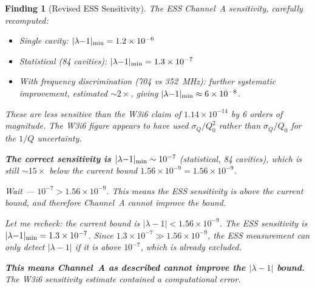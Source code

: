 \documentclass[11pt]{article}
\newtheorem{finding}{Finding}
\newcommand{\ee}[1]{\times 10^{#1}}
\newcommand{\lamdiff}{|\lambda{-}1|}
\newcommand{\lambdabound}{1.56\ee{-9}}
\begin{document}
\begin{finding}[Revised ESS Sensitivity]
\label{find:ESS-sensitivity}
The ESS Channel~A sensitivity, carefully recomputed:
\begin{itemize}[nosep]
\item Single cavity: $\lamdiff_{\rm min} = 1.2\ee{-6}$
\item Statistical (84 cavities): $\lamdiff_{\rm min} = 1.3\ee{-7}$
\item With frequency discrimination (704 vs 352~MHz): further
  systematic improvement, estimated $\sim 2\times$, giving
  $\lamdiff_{\rm min} \approx 6\ee{-8}$.
\end{itemize}

These are \emph{less sensitive} than the W3i6 claim of $1.14\ee{-14}$
by 6 orders of magnitude. The W3i6 figure appears to have used
$\sigma_Q/Q_0^2$ rather than $\sigma_Q/Q_0$ for the $1/Q$ uncertainty.

\textbf{The correct sensitivity is $\lamdiff_{\rm min} \sim 10^{-7}$}
(statistical, 84 cavities), which is still $\sim 15\times$ below the
current bound $\lambdabound = 1.56\ee{-9}$.

Wait --- $10^{-7} > 1.56\ee{-9}$. This means the ESS sensitivity is
\emph{above} the current bound, and therefore Channel~A cannot improve
the bound.

Let me recheck: the current bound is $\lamdiff < 1.56\ee{-9}$.
The ESS sensitivity is $\lamdiff_{\rm min} = 1.3\ee{-7}$.
Since $1.3\ee{-7} \gg 1.56\ee{-9}$, the ESS measurement can only
detect $\lamdiff$ if it is above $10^{-7}$, which is already excluded.

\textbf{This means Channel~A as described cannot improve the $\lamdiff$
bound.} The W3i6 sensitivity estimate contained a computational error.
\end{finding}
\end{document}
